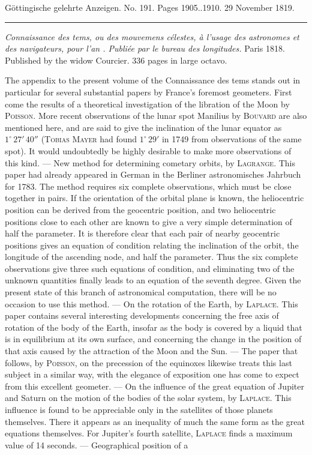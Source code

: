 \clearpage
{}
\begin{center}\small Göttingische gelehrte Anzeigen. No. 191. Pages 1905..1910. 29 November 1819.\\[3pt]\rule{.72\linewidth}{.3pt}\end{center}

\noindent\emph{Connaissance des tems, ou des mouvemens célestes, à l'usage des astronomes et des navigateurs, pour l'an {}. Publiée par le bureau des longitudes.} Paris 1818. Published by the widow Courcier. 336 pages in large octavo.

\begingroup{}\relax
The appendix to the present volume of the Connaissance des tems stands out in particular for several substantial papers by France’s foremost geometers. First come the results of a theoretical investigation of the libration of the Moon by \textsc{Poisson}. More recent observations of the lunar spot Manilius by \textsc{Bouvard} are also mentioned here, and are said to give the inclination of the lunar equator as $1^\circ\,27'\,40''$ (\textsc{Tobias Mayer} had found $1^\circ\,29'$ in 1749 from observations of the same spot). It would undoubtedly be highly desirable to make more observations of this kind. --- New method for determining cometary orbits, by \textsc{Lagrange}. This paper had already appeared in German in the Berliner astronomisches Jahrbuch for 1783. The method requires six complete observations, which must be close together in pairs. If the orientation of the orbital plane is known, the heliocentric position can be derived from the geocentric position, and two heliocentric positions close to each other are known to give a very simple determination of half the parameter. It is therefore clear that each pair of nearby geocentric positions gives an equation of condition relating the inclination of the orbit, the longitude of the ascending node, and half the parameter. Thus the six complete observations give three such equations of condition, and eliminating two of the unknown quantities finally leads to an equation of the seventh degree. Given the present state of this branch of astronomical computation, there will be no occasion to use this method. --- On the rotation of the Earth, by \textsc{Laplace}. This paper contains several interesting developments concerning the free axis of rotation of the body of the Earth, insofar as the body is covered by a liquid that is in equilibrium at its own surface, and concerning the change in the position of that axis caused by the attraction of the Moon and the Sun. --- The paper that follows, by \textsc{Poisson}, on the precession of the equinoxes likewise treats this last subject in a similar way, with the elegance of exposition one has come to expect from this excellent geometer. --- On the influence of the great equation of Jupiter and Saturn on the motion of the bodies of the solar system, by \textsc{Laplace}. This influence is found to be appreciable only in the satellites of those planets themselves. There it appears as an inequality of much the same form as the great equations themselves. For Jupiter’s fourth satellite, \textsc{Laplace} finds a maximum value of 14 seconds. --- Geographical position of a 